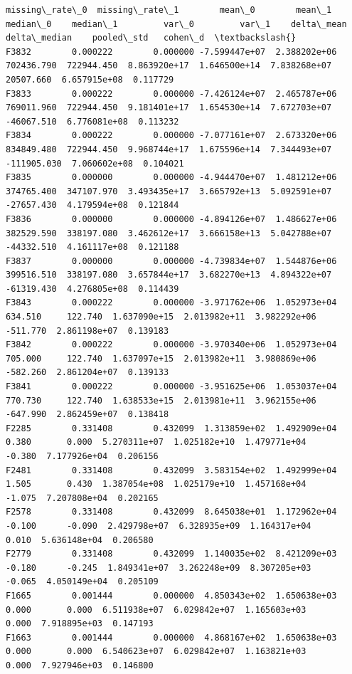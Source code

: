 \documentclass[11pt]{article}
\begin{document}
    
    \begin{Verbatim}[commandchars=\\\{\}]
       missing\_rate\_0  missing\_rate\_1        mean\_0        mean\_1    median\_0    median\_1         var\_0         var\_1    delta\_mean  delta\_median    pooled\_std   cohen\_d  \textbackslash{}
F3832        0.000222        0.000000 -7.599447e+07  2.388202e+06  702436.790  722944.450  8.863920e+17  1.646500e+14  7.838268e+07     20507.660  6.657915e+08  0.117729   
F3833        0.000222        0.000000 -7.426124e+07  2.465787e+06  769011.960  722944.450  9.181401e+17  1.654530e+14  7.672703e+07    -46067.510  6.776081e+08  0.113232   
F3834        0.000222        0.000000 -7.077161e+07  2.673320e+06  834849.480  722944.450  9.968744e+17  1.675596e+14  7.344493e+07   -111905.030  7.060602e+08  0.104021   
F3835        0.000000        0.000000 -4.944470e+07  1.481212e+06  374765.400  347107.970  3.493435e+17  3.665792e+13  5.092591e+07    -27657.430  4.179594e+08  0.121844   
F3836        0.000000        0.000000 -4.894126e+07  1.486627e+06  382529.590  338197.080  3.462612e+17  3.666158e+13  5.042788e+07    -44332.510  4.161117e+08  0.121188   
F3837        0.000000        0.000000 -4.739834e+07  1.544876e+06  399516.510  338197.080  3.657844e+17  3.682270e+13  4.894322e+07    -61319.430  4.276805e+08  0.114439   
F3843        0.000222        0.000000 -3.971762e+06  1.052973e+04     634.510     122.740  1.637090e+15  2.013982e+11  3.982292e+06      -511.770  2.861198e+07  0.139183   
F3842        0.000222        0.000000 -3.970340e+06  1.052973e+04     705.000     122.740  1.637097e+15  2.013982e+11  3.980869e+06      -582.260  2.861204e+07  0.139133   
F3841        0.000222        0.000000 -3.951625e+06  1.053037e+04     770.730     122.740  1.638533e+15  2.013981e+11  3.962155e+06      -647.990  2.862459e+07  0.138418   
F2285        0.331408        0.432099  1.313859e+02  1.492909e+04       0.380       0.000  5.270311e+07  1.025182e+10  1.479771e+04        -0.380  7.177926e+04  0.206156   
F2481        0.331408        0.432099  3.583154e+02  1.492999e+04       1.505       0.430  1.387054e+08  1.025179e+10  1.457168e+04        -1.075  7.207808e+04  0.202165   
F2578        0.331408        0.432099  8.645038e+01  1.172962e+04      -0.100      -0.090  2.429798e+07  6.328935e+09  1.164317e+04         0.010  5.636148e+04  0.206580   
F2779        0.331408        0.432099  1.140035e+02  8.421209e+03      -0.180      -0.245  1.849341e+07  3.262248e+09  8.307205e+03        -0.065  4.050149e+04  0.205109   
F1665        0.001444        0.000000  4.850343e+02  1.650638e+03       0.000       0.000  6.511938e+07  6.029842e+07  1.165603e+03         0.000  7.918895e+03  0.147193   
F1663        0.001444        0.000000  4.868167e+02  1.650638e+03       0.000       0.000  6.540623e+07  6.029842e+07  1.163821e+03         0.000  7.927946e+03  0.146800   


\end{Verbatim}
\end{document}
